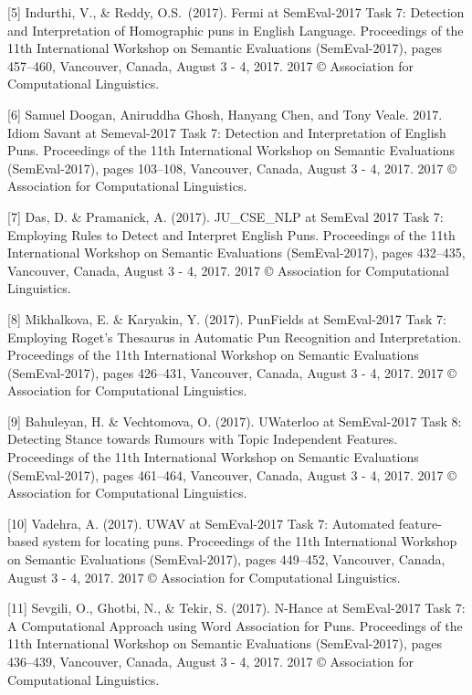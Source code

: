 \documentclass{article}
\begin{document}
[5] Indurthi, V., \&  Reddy, O.S.\ (2017). Fermi at SemEval-2017 Task
7: Detection and Interpretation of Homographic puns in English Language.
Proceedings of the 11th International Workshop on Semantic Evaluations
(SemEval-2017), pages 457–460, Vancouver, Canada, August 3 - 4, 2017. 2017 ©
Association for Computational Linguistics.

[6] Samuel Doogan, Aniruddha Ghosh, Hanyang Chen, and Tony Veale. 2017. Idiom
Savant at Semeval-2017 Task 7: Detection and Interpretation of English Puns.
Proceedings of the 11th International Workshop on Semantic Evaluations
(SemEval-2017), pages 103–108, Vancouver, Canada, August 3 - 4, 2017. 2017 ©
Association for Computational Linguistics.

[7] Das, D. \& Pramanick, A. (2017). JU\_CSE\_NLP at SemEval 2017 Task 7:
Employing Rules to Detect and Interpret English Puns. Proceedings of the 11th
International Workshop on Semantic Evaluations (SemEval-2017), pages 432–435,
Vancouver, Canada, August 3 - 4, 2017. 2017 © Association for Computational
Linguistics.

[8] Mikhalkova, E. \& Karyakin, Y. (2017). PunFields at SemEval-2017 Task 7:
Employing Roget’s Thesaurus in Automatic Pun Recognition and Interpretation.
Proceedings of the 11th International Workshop on Semantic Evaluations
(SemEval-2017), pages 426–431, Vancouver, Canada, August 3 - 4, 2017. 2017 ©
Association for Computational Linguistics.

[9] Bahuleyan, H. \& Vechtomova, O. (2017). UWaterloo at SemEval-2017 Task 8:
Detecting Stance towards Rumours with Topic Independent Features. Proceedings
of the 11th International Workshop on Semantic Evaluations (SemEval-2017),
pages 461–464, Vancouver, Canada, August 3 - 4, 2017. 2017 © Association for
Computational Linguistics.

[10] Vadehra, A. (2017). UWAV at SemEval-2017 Task 7: Automated feature-based
system for locating puns. Proceedings of the 11th International Workshop on
Semantic Evaluations (SemEval-2017), pages 449–452, Vancouver, Canada, August 3
- 4, 2017. 2017 © Association for Computational Linguistics.

[11] Sevgili, O., Ghotbi, N., \& Tekir, S. (2017). N-Hance at SemEval-2017 Task
7: A Computational Approach using Word Association for Puns. Proceedings of the
11th International Workshop on Semantic Evaluations (SemEval-2017), pages
436–439, Vancouver, Canada, August 3 - 4, 2017. 2017 © Association for
Computational Linguistics.

\end{document}
